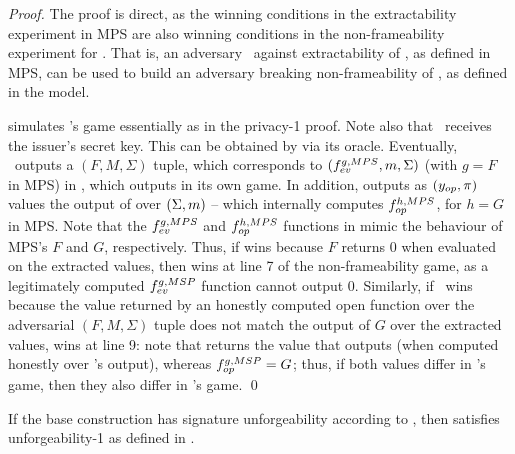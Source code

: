 \begin{proof}  
  The proof is direct, as the winning conditions in the extractability
  experiment in MPS are also winning conditions in the non-frameability
  experiment for \UAS. That is, an adversary \adv~against extractability of
  \CUASMPS, as defined in MPS, can be used to build an adversary \advB breaking
  non-frameability of \CUASGen, as defined in the \UAS model.

  \advB simulates \adv's game essentially as in the privacy-1 proof. Note also
  that \adv~receives the issuer's secret key. This can be obtained by \advB via
  its \ICORR oracle. Eventually, \adv~outputs a $(F,M,\Sigma)$ tuple, which
  corresponds to $(f_{ev}^{g,MPS},m,\Sigma)$ (with $g=F$ in MPS) in \CUASGen,
  which \advB outputs in its own game. In addition, \advB outputs as $(y_{op},
  \pi)$ values the output of \Open over $(\Sigma,m)$ -- which internally
  computes $f_{op}^{h,MPS}$, for $h=G$ in MPS.
  Note that the $f_{ev}^{g,MPS}$ and $f_{op}^{h,MPS}$ functions in \CUASMPS
  mimic the behaviour of MPS's $F$ and $G$, respectively. Thus, if \adv wins
  because $F$ returns $0$ when evaluated on the extracted values, then \advB
  wins at line 7 of the non-frameability game, as a legitimately computed
  $f_{ev}^{g,MSP}$ function cannot output $0$. Similarly, if \adv~wins because
  the value returned by an honestly computed open function over the adversarial
  $(F,M,\Sigma)$ tuple does not match the output of $G$ over the extracted
  values, \advB wins at line 9: note that \advB returns the \yinsp value that
  \Open outputs (when computed honestly over \adv's output), whereas
  $f_{op}^{g,MSP}=G$; thus, if both values differ in \adv's game, then they also
  differ in \advB's game.
  \qed
\end{proof}

\begin{theorem}
  If the base \CUASGen construction has signature unforgeability according to
  , then \CUASMPS satisfies unforgeability-1 as
  defined in \cite{ngsy22}.
\end{theorem}

